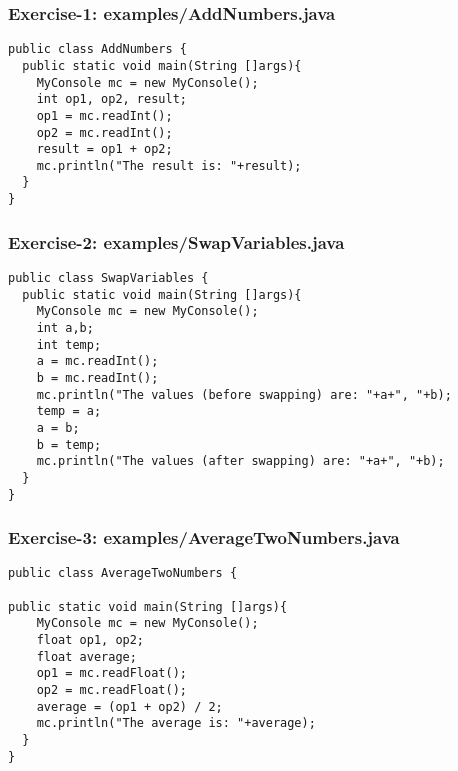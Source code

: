 \documentclass[xcolor=dvipsnames,dvip,notes=show,handout,table]{beamer}
\begin{document}
\begin{frame}[fragile]
\frametitle{Exercise-1: examples/AddNumbers.java}
\scriptsize
\begin{lstlisting}
public class AddNumbers {
  public static void main(String []args){
    MyConsole mc = new MyConsole();
    int op1, op2, result;
    op1 = mc.readInt();
    op2 = mc.readInt();
    result = op1 + op2;
    mc.println("The result is: "+result);
  }
}
\end{lstlisting}
\end{frame}




\begin{frame}[fragile]
\frametitle{Exercise-2: examples/SwapVariables.java}
\scriptsize
\begin{lstlisting}
public class SwapVariables {
  public static void main(String []args){
    MyConsole mc = new MyConsole();
    int a,b;
    int temp;
    a = mc.readInt();
    b = mc.readInt();
    mc.println("The values (before swapping) are: "+a+", "+b);
    temp = a;
    a = b;
    b = temp;
    mc.println("The values (after swapping) are: "+a+", "+b);
  }
}
\end{lstlisting}
\end{frame}





\begin{frame}[fragile]
\frametitle{Exercise-3: examples/AverageTwoNumbers.java}
\scriptsize
\begin{lstlisting}
public class AverageTwoNumbers {

public static void main(String []args){
    MyConsole mc = new MyConsole();
    float op1, op2;
    float average;
    op1 = mc.readFloat();
    op2 = mc.readFloat();
    average = (op1 + op2) / 2;
    mc.println("The average is: "+average);
  }
}
\end{lstlisting}
\end{frame}


\end{document}
